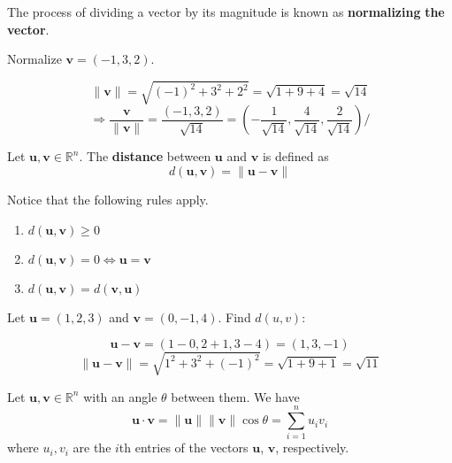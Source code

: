 \begin{remark}
    The process of dividing a vector by its magnitude is known as \textbf{normalizing} \textbf{the} \textbf{vector}.
\end{remark}
\begin{exercise}
    Normalize \(\mathbf{v} =(-1,3,2)\).\\
    \begin{answer}
        \[\lVert \mathbf{v}  \rVert=\sqrt{(-1)^2 + 3^2 + 2^2}=\sqrt{1+9+4}=\sqrt{14}    \]
        \[
            \Longrightarrow \frac{\mathbf{v} }{\lVert \mathbf{v}  \rVert }=\frac{(-1,3,2)}{\sqrt{14} }=\left( -\frac{1}{\sqrt{14} },\frac{4}{\sqrt{14} },\frac{2}{\sqrt{14} } \right) /
        \]
    \end{answer}
\end{exercise}
\begin{definition}
    Let \(\mathbf{u} ,\mathbf{v} \in\mathbb{R} ^n\). The \textbf{distance} between \(\mathbf{u} \) and \(\mathbf{v} \) is defined as
    \[
        d\left( \mathbf{u} ,\mathbf{v}  \right) =  \left\lVert \mathbf{u} -\mathbf{v}  \right\rVert 
    \]
\end{definition}
Notice that the following rules apply.
\begin{enumerate}
    \item \(d\left( \mathbf{u} ,\mathbf{v}  \right)\geq 0 \) 
    \item \(d\left( \mathbf{u} ,\mathbf{v}  \right)=0 \iff \mathbf{u} =\mathbf{v}  \)
    \item \(d\left( \mathbf{u} ,\mathbf{v}  \right)=d\left( \mathbf{v} ,\mathbf{u}  \right)  \)
\end{enumerate}
\begin{exercise}
    Let \(\mathbf{u} =(1,2,3)\) and \(\mathbf{v} =(0,-1,4)\). Find \(d\left( u,v \right) \):
    \begin{answer}
    \[
        \mathbf{u} -\mathbf{v} = (1-0,2+1,3-4)=(1,3,-1)
    \]
    \[
        \left\lVert \mathbf{u} -\mathbf{v}  \right\rVert =\sqrt{1^2 + 3^2 + (-1)^2}=\sqrt{1+9+1}=\sqrt{11}   
    \]
    \end{answer}
\end{exercise}
\begin{definition}
    Let \(\mathbf{u} ,\mathbf{v} \in\mathbb{R} ^n\) with an angle \(\theta \) between them. We have\\
    \[
        \mathbf{u} \cdot \mathbf{v} = \lVert \mathbf{u}  \rVert \lVert \mathbf{v}  \rVert \cos \theta = \sum_{i=1}^n u_i v_i 
    \]
    where \(u_i,v_i\) are the \(i\)th entries of the vectors \(\mathbf{u} \), \(\mathbf{v} \), respectively.
\end{definition}
